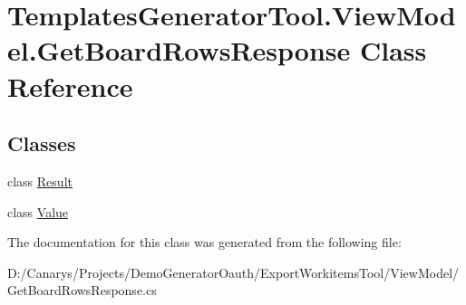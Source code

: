 \hypertarget{class_templates_generator_tool_1_1_view_model_1_1_get_board_rows_response}{}\section{Templates\+Generator\+Tool.\+View\+Model.\+Get\+Board\+Rows\+Response Class Reference}
\label{class_templates_generator_tool_1_1_view_model_1_1_get_board_rows_response}
\subsection*{Classes}
\begin{DoxyCompactItemize}
\item 
class \mbox{\hyperlink{class_templates_generator_tool_1_1_view_model_1_1_get_board_rows_response_1_1_result}{Result}}
\item 
class \mbox{\hyperlink{class_templates_generator_tool_1_1_view_model_1_1_get_board_rows_response_1_1_value}{Value}}
\end{DoxyCompactItemize}


The documentation for this class was generated from the following file\+:\begin{DoxyCompactItemize}
\item 
D\+:/\+Canarys/\+Projects/\+Demo\+Generator\+Oauth/\+Export\+Workitems\+Tool/\+View\+Model/Get\+Board\+Rows\+Response.\+cs\end{DoxyCompactItemize}
